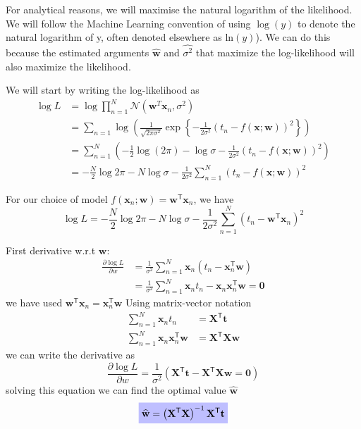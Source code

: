 For analytical reasons, we will maximise the natural logarithm of the likelihood.
We will follow the Machine Learning convention of using $\log(y)$ to denote the
natural logarithm of y, often denoted elsewhere as $\mathrm{ln}(y)$).
We can do this because the estimated arguments $\widehat{\mathbf{w}}$
and $\widehat{\sigma^2}$ that maximize the log-likelihood will also maximize
the likelihood.

We will start by writing the log-likelihood as
\begin{align*}
\log L & = \log \prod_{n=1}^{N} \mathcal{N}(\mathbf{w}^{T}\mathbf{x}_{n},\sigma^2) \\
& = \sum_{n=1} \log \left( \frac{1}{\sqrt{2\pi\sigma^2}}
\exp\left\{ -\frac{1}{2\sigma^2}
\left( t_{n} - f(\mathbf{x};\mathbf{w}) \right)^2
\right\} \right) \\
& = \sum_{n=1}^{N} \left(
-\frac{1}{2}\log(2\pi) - \log\sigma - \frac{1}{2\sigma^2}
\left( t_{n} - f(\mathbf{x};\mathbf{w}) \right)^2 \right) \\
& = -\frac{N}{2}\log 2\pi - N\log\sigma - \frac{1}{2\sigma^2}
\sum_{n=1}^{N} \left( t_{n} - f(\mathbf{x};\mathbf{w}) \right)^2
\end{align*}

For our choice of model
$f(\mathbf{x}_{n}; \mathbf{w}) = \mathbf{w}^{\mathsf{T}}\mathbf{x}_{n}$, we have
\begin{equation}
\log L = -\frac{N}{2} \log 2\pi - N\log\sigma - \frac{1}{2\sigma^2}
\sum_{n=1}^{N} \left( t_{n} - \mathbf{w}^{\mathsf{T}}\mathbf{x}_{n} \right)^2
\end{equation}

First derivative w.r.t $\mathbf{w}$:
\begin{align*}
\frac{\partial\log L}{\partial w} & = \frac{1}{\sigma^2}
\sum_{n=1}^{N} \mathbf{x}_{n} \left( t_{n} - \mathbf{x}^{\mathsf{T}}_{n} \mathbf{w} \right) \\
& = \frac{1}{\sigma^2}\sum_{n=1}^{N} \mathbf{x}_{n} t_{n} - 
\mathbf{x}_{n}\mathbf{x}_{n}^{\mathsf{T}}\mathbf{w}
= \mathbf{0}
\end{align*}
we have used
$\mathbf{w}^{\mathsf{T}}\mathbf{x}_{n} = \mathbf{x}_{n}^{\mathsf{T}}\mathbf{w}$
%
Using matrix-vector notation
\begin{align*}
\sum_{n=1}^{N} \mathbf{x}_{n} t_{n} & = \mathbf{X}^{\mathsf{T}}\mathbf{t} \\
\sum_{n=1}^{N} \mathbf{x}_{n} \mathbf{x}_{n}^{\mathsf{T}}\mathbf{w} & = 
\mathbf{X}^{\mathsf{T}}\mathbf{X}\mathbf{w}
\end{align*}
we can write the derivative as
\begin{equation}
\frac{\partial\log L}{\partial w} = \frac{1}{\sigma^2}\left(
\mathbf{X}^{\mathsf{T}}\mathbf{t} - \mathbf{X}^{\mathsf{T}}\mathbf{X}\mathbf{w} = \mathbf{0}
\right)
\end{equation}
solving this equation we can find the optimal value $\widehat{\mathbf{w}}$
\begin{equation}
\highlighteq{
\widehat{\mathbf{w}} = \left(\mathbf{X}^{\mathsf{T}}\mathbf{X}\right)^{-1}
\mathbf{X}^{\mathsf{T}}\mathbf{t}
}
\end{equation}

